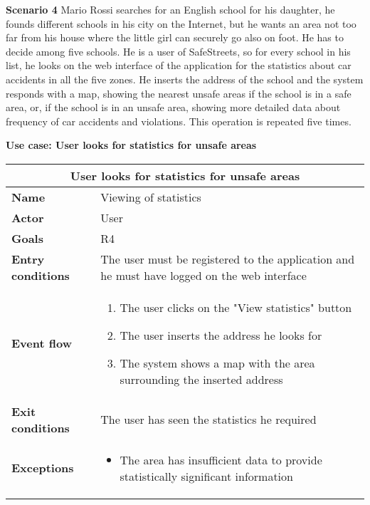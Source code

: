 \begin{description}
    \item \textbf{Scenario 4} \newline
        Mario Rossi searches for an English school for his daughter, he founds different schools in his city on the Internet, but he wants an area 
        not too far from his house where the little girl can securely go also on foot. He has to decide among five schools. He is a user of SafeStreets, so 
        for every school in his list, he looks on the web interface of the application for the statistics about car accidents in all the five zones. He inserts the address of the school and the system responds with a map, showing the nearest unsafe areas if the school is in a safe area, or, if the school is in an unsafe 
        area, showing more detailed data about frequency of car accidents and violations. This operation is repeated five times.

    \item \textbf{Use case: User looks for statistics for unsafe areas}
        \begin{center}
            \begin{tabular}{|p{3cm}|p{7cm}|}
                \multicolumn{2}{c}{\textbf{User looks for statistics for unsafe areas}} \\
                \hline
                \textbf{Name} & Viewing of statistics \\
                \hline
                \textbf{Actor} & User \\
                \hline
                \textbf{Goals} & R4 \\
                \hline
                \textbf{Entry conditions} & The user must be registered to the application and he must have logged on the web interface\\
                \hline
                \textbf{Event flow} &
                \begin{enumerate}
                    \item The user clicks on the "View statistics" button
                    \item The user inserts the address he looks for
                    \item The system shows a map with the area surrounding the inserted address
                \end{enumerate} \\
                \hline
                \textbf{Exit conditions} & The user has seen the statistics he required \\
                \hline
                \textbf{Exceptions}
                & \begin{itemize}
                    \item The area has insufficient data to provide statistically significant information
                \end{itemize} \\
                \hline
            \end{tabular}
        \end{center}
\end{description}

